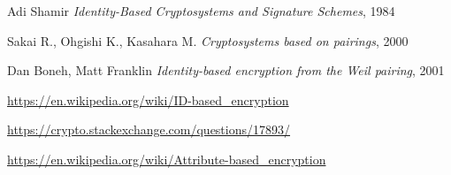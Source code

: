 \documentclass[12pt]{article}
\begin{document}
\begin{thebibliography}{9}
Adi Shamir
\textit{Identity-Based Cryptosystems and Signature Schemes}, 1984 

Sakai R., Ohgishi K., Kasahara M.
\textit{Cryptosystems based on pairings}, 2000 

Dan Boneh, Matt Franklin
\textit{Identity-based encryption from the Weil pairing}, 2001

\href{https://en.wikipedia.org/wiki/ID-based_encryption}{https://en.wikipedia.org/wiki/ID-based\_encryption}

\href{https://crypto.stackexchange.com/questions/17893/what-is-attribute-based-encryption?utm_medium=organic&utm_source=google_rich_qa&utm_campaign=google_rich_qa}{https://crypto.stackexchange.com/questions/17893/}

\href{https://en.wikipedia.org/wiki/Attribute-based_encryption}{https://en.wikipedia.org/wiki/Attribute-based\_encryption}

\end{thebibliography}

\vspace{\baselineskip}
\end{document}
